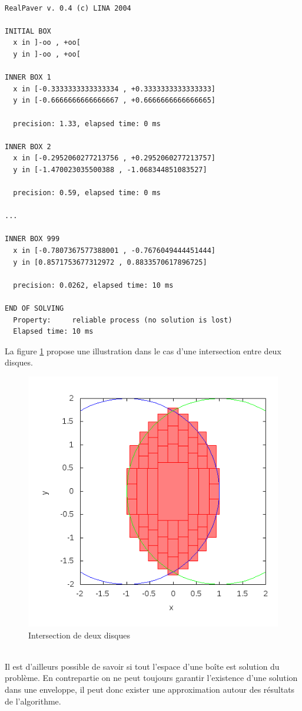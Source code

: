 \begin{verbatim}

RealPaver v. 0.4 (c) LINA 2004

INITIAL BOX
  x in ]-oo , +oo[
  y in ]-oo , +oo[

INNER BOX 1
  x in [-0.3333333333333334 , +0.3333333333333333]
  y in [-0.6666666666666667 , +0.6666666666666665]

  precision: 1.33, elapsed time: 0 ms

INNER BOX 2
  x in [-0.2952060277213756 , +0.2952060277213757]
  y in [-1.470023035500388 , -1.068344851083527]

  precision: 0.59, elapsed time: 0 ms

...

INNER BOX 999
  x in [-0.7807367577388001 , -0.7676049444451444]
  y in [0.8571753677312972 , 0.8833570617896725]

  precision: 0.0262, elapsed time: 10 ms

END OF SOLVING
  Property:     reliable process (no solution is lost)
  Elapsed time: 10 ms
\end{verbatim}
\clearpage
La figure \ref{fig:DisqueDisque} propose une illustration dans le cas d'une intersection entre deux disques.
\begin{figure}[ht!] %
  \center
\includegraphics[scale=0.50]{img/disk-disk}
  \caption{Intersection de deux disques} %
 \label{fig:DisqueDisque} %
\end{figure} %
\\
 Il est d'ailleurs possible de savoir si tout l'espace d'une boîte est solution du problème. En contrepartie on ne peut toujours garantir l'existence d'une solution dans une enveloppe, il peut donc exister une approximation autour des résultats de l'algorithme.

